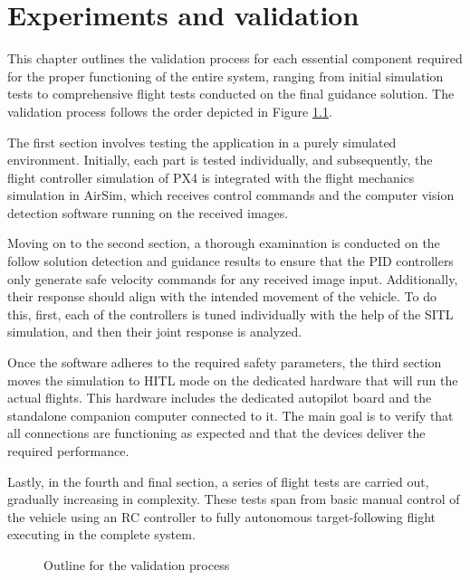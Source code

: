 \chapter{Experiments and validation}
\label{chap:validation}

This chapter outlines the validation process for each essential component required for the proper functioning of the entire system, ranging from initial simulation tests to comprehensive flight tests conducted on the final guidance solution. The validation process follows the order depicted in Figure \ref{fig:validation-chart}.

The first section involves testing the application in a purely simulated environment. Initially, each part is tested individually, and subsequently, the flight controller simulation of PX4 is integrated with the flight mechanics simulation in AirSim, which receives control commands and the computer vision detection software running on the received images.

Moving on to the second section, a thorough examination is conducted on the follow solution detection and guidance results to ensure that the PID controllers only generate safe velocity commands for any received image input. Additionally, their response should align with the intended movement of the vehicle. To do this, first, each of the controllers is tuned individually with the help of the SITL simulation, and then their joint response is analyzed.

Once the software adheres to the required safety parameters, the third section moves the simulation to HITL mode on the dedicated hardware that will run the actual flights. This hardware includes the dedicated autopilot board and the standalone companion computer connected to it. The main goal is to verify that all connections are functioning as expected and that the devices deliver the required performance.

Lastly, in the fourth and final section, a series of flight tests are carried out, gradually increasing in complexity. These tests span from basic manual control of the vehicle using an RC controller to fully autonomous target-following flight executing in the complete system.

\begin{figure}
  \centering
  \caption{Outline for the validation process}\label{fig:validation-chart}
\end{figure}





